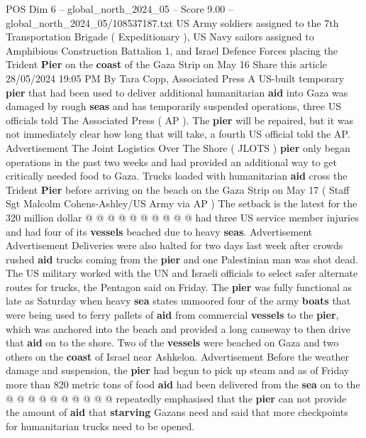 \begin{textsample}{POS Dim 6 – global\_north\_2024\_05 – Score 9.00 – global\_north\_2024\_05/108537187.txt}  \label{ex:f6_pos_148}
US Army soldiers assigned to the 7th Transportation Brigade ( Expeditionary ), US Navy sailors assigned to Amphibious Construction Battalion 1, and Israel Defence Forces placing the Trident \textbf{Pier} on the \textbf{coast} of the Gaza Strip on May 16 Share this article 28/05/2024 19:05 PM By Tara Copp, Associated Press A US-built temporary \textbf{pier} that had been used to deliver additional humanitarian \textbf{aid} into Gaza was damaged by rough \textbf{seas} and has temporarily suspended operations, three US officials told The Associated Press ( AP ).
The \textbf{pier} will be repaired, but it was not immediately clear how long that will take, a fourth US official told the AP.
Advertisement The Joint Logistics Over The Shore ( JLOTS ) \textbf{pier} only began operations in the past two weeks and had provided an additional way to get critically needed food to Gaza.
Trucks loaded with humanitarian \textbf{aid} cross the Trident \textbf{Pier} before arriving on the beach on the Gaza Strip on May 17 ( Staff Sgt Malcolm Cohens-Ashley/US Army via AP ) The setback is the latest for the 320 million dollar @ @ @ @ @ @ @ @ @ @ had three US service member injuries and had four of its \textbf{vessels} beached due to heavy \textbf{seas}.
Advertisement Advertisement Deliveries were also halted for two days last week after crowds rushed \textbf{aid} trucks coming from the \textbf{pier} and one Palestinian man was shot dead.
The US military worked with the UN and Israeli officials to select safer alternate routes for trucks, the Pentagon said on Friday.
The \textbf{pier} was fully functional as late as Saturday when heavy \textbf{sea} states unmoored four of the army \textbf{boats} that were being used to ferry pallets of \textbf{aid} from commercial \textbf{vessels} to the \textbf{pier}, which was anchored into the beach and provided a long causeway to then drive that \textbf{aid} on to the shore.
Two of the \textbf{vessels} were beached on Gaza and two others on the \textbf{coast} of Israel near Ashkelon.
Advertisement Before the weather damage and suspension, the \textbf{pier} had begun to pick up steam and as of Friday more than 820 metric tons of food \textbf{aid} had been delivered from the \textbf{sea} on to the @ @ @ @ @ @ @ @ @ @ repeatedly emphasised that the \textbf{pier} can not provide the amount of \textbf{aid} that \textbf{starving} Gazans need and said that more checkpoints for humanitarian trucks need to be opened.

\end{textsample}
